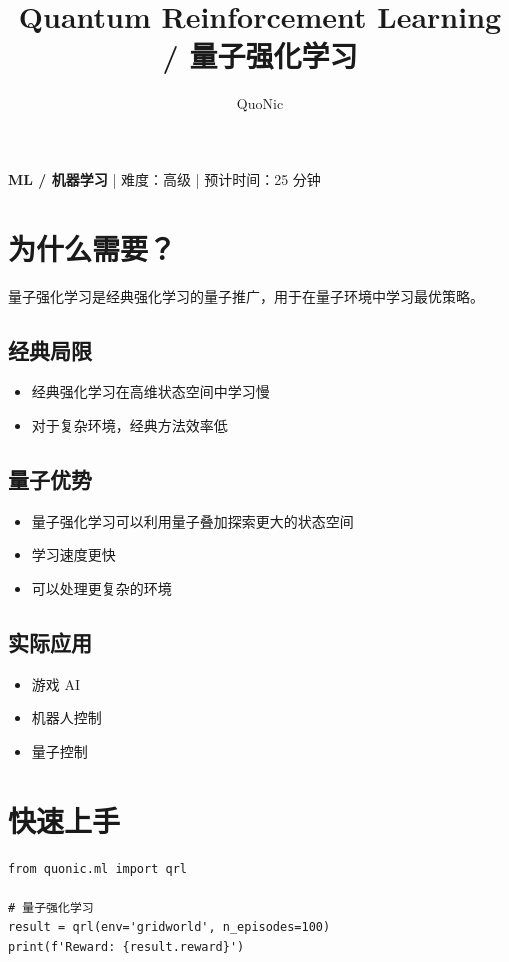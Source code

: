 \documentclass[12pt,a4paper]{article}
\title{Quantum Reinforcement Learning / 量子强化学习}
\author{QuoNic}
\date{}
\begin{document}
\maketitle

\begin{center}
\textbf{ML / 机器学习} | 难度：高级 | 预计时间：25 分钟
\end{center}

\tableofcontents
\newpage

\section{为什么需要？}

量子强化学习是经典强化学习的量子推广，用于在量子环境中学习最优策略。

\subsection{经典局限}
\begin{itemize}
  \item 经典强化学习在高维状态空间中学习慢
  \item 对于复杂环境，经典方法效率低
\end{itemize}

\subsection{量子优势}
\begin{itemize}
  \item 量子强化学习可以利用量子叠加探索更大的状态空间
  \item 学习速度更快
  \item 可以处理更复杂的环境
\end{itemize}

\subsection{实际应用}
\begin{itemize}
  \item 游戏 AI
  \item 机器人控制
  \item 量子控制
\end{itemize}

\section{快速上手}

\begin{verbatim}
from quonic.ml import qrl

# 量子强化学习
result = qrl(env='gridworld', n_episodes=100)
print(f'Reward: {result.reward}')
\end{verbatim}
\end{document}
